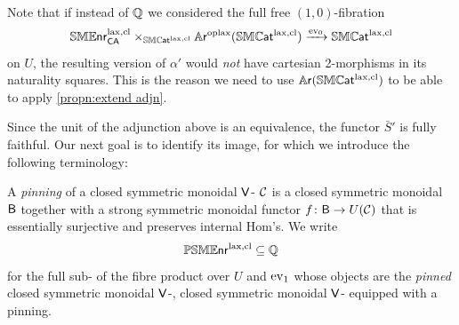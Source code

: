 \documentclass[a4paper,11pt]{article}
\newcommand{\SMENRlc}{\SMENR^{\lax,\cl}_{\CA}}
\begin{document}
\begin{remark}
  Note that if instead of $\mathbb{Q}$ we considered the full free
  $(1,0)$-fibration
  \[ \SMENRlc \times_{\SMCATlcl} \ARopl(\SMCATlcl) \xto{\ev_{0}}
    \SMCATlcl\] on $U$, the resulting version of $\alpha'$ would
  \emph{not} have cartesian 2-morphisms in its naturality
  squares. This is the reason we need to use $\mathbb{A}\mkern-0.5mu\textsf{\textup{r}}(\mathbb{SMC}\mkern-0.5mu\textsf{\textup{at}}^{\text{\textup{lax}},\text{\textup{cl}}})$ to be
  able to apply \cref{propn:extend adjn}.
\end{remark}
 
Since the unit of the adjunction above is an equivalence, the functor
$\bar{S}'$ is fully faithful. Our next goal is to identify its image,
for which we introduce the following terminology:
\begin{defn}
  A \emph{pinning} of a
  closed symmetric monoidal $\textup{\textsf{V}}$-\icat{} $\mathcal{C}$ is a closed symmetric
  monoidal \icat{} $\textup{\textsf{B}}$ together with a strong symmetric
  monoidal functor $f \colon \oB \to U(\eC)$ that is essentially
  surjective and preserves internal Hom's. We write
  \[ \mathbb{PSME}\mkern-0.5mu\textsf{\textup{nr}}^{\text{\textup{lax}},\text{\textup{cl}}} \subseteq \mathbb{Q}\]
  for the full sub-\itcat{} of the fibre product over $U$ and
  $\text{\textup{ev}}_{1}$ whose objects are the \emph{pinned} closed symmetric
  monoidal $\textup{\textsf{V}}$-\icats{}, \ie{} closed symmetric monoidal
  $\textup{\textsf{V}}$-\icats{} equipped with a pinning.
\end{defn}
\end{document}
